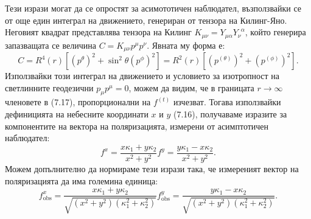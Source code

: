 Тези изрази могат да се опростят за асимототичен наблюдател, възползвайки се от още един интеграл на движението, генериран от тензора на Килинг-Яно. Неговият квадрат представлява тензора на Килинг $K_{\mu\nu} = Y_{\mu\alpha}Y_{\nu}^{\,\,\,\alpha}$, който генерира запазващата се величина $C = K_{\mu\nu}p^\mu p^\nu$. Явната му форма е:
\begin{equation}
	C =  R^4(r)\left[\left(p^{\theta}\right)^2 + \sin^2\theta \left(p^{\phi}\right)^2\right] = R^2(r)\left[\left(p^{(\theta)}\right)^2 + \left(p^{(\phi)}\right)^2\right].
\end{equation}
Използвайки този интеграл на движението и условието за изотропност на светлинните геодезични $p_\mu p^\mu = 0$, можем да видим, че в границата $r\rightarrow\infty$ членовете в (7.17), пропорционални на $f^{(t)}$ изчезват. Тогава използвайки дефиницията на небесните координати $x$ и $y$ (7.16), получаваме изразите за компонентите на вектора на поляризацията, измерени от асимптотичен наблюдател:
\begin{subequations}
	\begin{equation}
		f^x = \frac{x\kappa_1 + y\kappa_2}{x^2 + y^2}
	\end{equation}
	\begin{equation}
		f^y = \frac{y \kappa_1 - x\kappa_2}{x^2 + y^2}.
	\end{equation}
\end{subequations}
Можем допълнително да нормираме тези изрази така, че измереният вектор на поляризацията да има големина единица:
\begin{subequations}
	\begin{equation}
		f^x_\text{obs} = \frac{x\kappa_1 + y\kappa_2}{\sqrt{(x^2 + y^2)(\kappa_1^2 + \kappa_2^2)}}
	\end{equation}
	\begin{equation}
		f^y_\text{obs} = \frac{y \kappa_1 - x\kappa_2}{\sqrt{(x^2 + y^2)(\kappa_1^2 + \kappa_2^2)}}.
	\end{equation}
\end{subequations}


